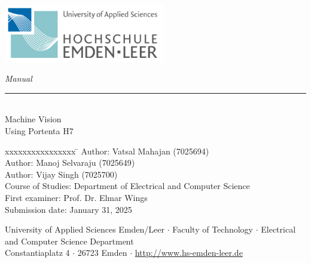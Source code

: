 %
%

\begin{titlepage}
	
	\begin{flushleft} 
		\includegraphics[width=7cm]{General/Logo.png}
	\end{flushleft} 
	
	\begin{flushright}
		\vspace{2cm}
		\LARGE \textsl{Manual}\\
		\rule{0.6\textwidth}{0.4pt} ~\\
		\vspace{0.5cm}
		\textsf{\LARGE Machine Vision}\\
		\textsf{\LARGE Using Portenta H7}
	\end{flushright}
	
	\vspace{3cm}
	\large
	\begin{tabbing}
		xxxxxxxxxxxxxxxx \= \kill
		Author: \> Vatsal Mahajan (7025694)\\
		Author: \> Manoj Selvaraju (7025649)\\
		Author: \> Vijay Singh (7025700)\\
		Course of Studies: \> Department of Electrical and Computer Science\\ [0.5cm]
		First examiner: \> Prof. Dr. Elmar Wings \\
		Submission date: \> January 31, 2025 \\
	\end{tabbing}
	
	\vspace{3cm}
	\small
	\begin{center}
		University of Applied Sciences Emden/Leer $\cdot$ 
		Faculty of Technology $\cdot$ 
		Electrical and Computer Science Department \\
		Constantiaplatz 4 $\cdot$ 
		26723 Emden $\cdot$ 
		\url{http://www.hs-emden-leer.de}
	\end{center}
	
\end{titlepage}
